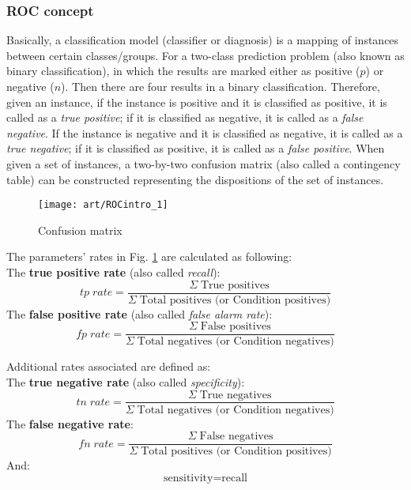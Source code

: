 \subsubsection{ROC concept}
Basically, a classification model (classifier or diagnosis) is a mapping of instances between certain classes/groups. For a two-class prediction problem (also known as binary classification), in which the results are marked either as positive ($p$) or negative ($n$). Then there are four results in a binary classification. Therefore, given an instance, if the instance is positive and it is classified as positive, it is called as a \textit{true positive}; if it is classified as negative, it is called as a \textit{false negative}. If the instance is negative and it is classified as negative, it is called as a \textit{true negative}; if it is classified as positive, it is called as a \textit{false positive}. When given a set of instances, a two-by-two confusion matrix (also called a contingency table) can be constructed representing the dispositions of the set of instances. 
\begin{figure}[ht]
	\centering
	\texttt{[image: art/ROCintro\_1]}
	\caption{Confusion matrix}
	\label{ROCintro_1}
\end{figure}

The parameters' rates in Fig. \ref{ROCintro_1} are calculated as following:\\
The \textbf{true positive rate} (also called \textit{recall}):
\begin{equation}
tp\; rate = \frac{\Sigma \; \text{True positives}}{\Sigma \; \text{Total positives (or Condition positives)}}
\end{equation}
The \textbf{false positive rate} (also called \textit{false alarm rate}):
\begin{equation}
fp\; rate = \frac{\Sigma \; \text{False positives}}{\Sigma \; \text{Total negatives (or Condition negatives)}}
\end{equation}

Additional rates associated are defined as:\\
The \textbf{true negative rate} (also called \textit{specificity}): 
\begin{equation}
tn\; rate = \frac{\Sigma \; \text{True negatives}}{\Sigma \; \text{Total negatives (or Condition negatives)}}
\end{equation}
The \textbf{false negative rate}:
\begin{equation}
fn\; rate = \frac{\Sigma \; \text{False negatives}}{\Sigma \; \text{Total positives (or Condition positives)}}
\end{equation}
And:
\begin{equation*}
\text{sensitivity} = \text{recall}
\end{equation*}


